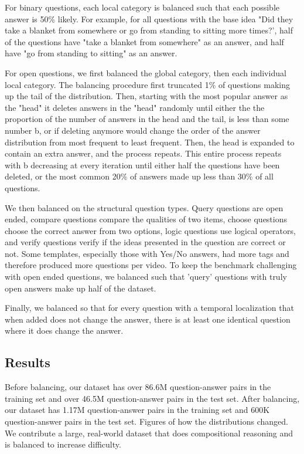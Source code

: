 For binary questions, each local category is balanced such that each possible answer is 50\% likely. For example, for all questions with the base idea "Did they take a blanket from somewhere or go from standing to sitting more times?', half of the questions have "take a blanket from somewhere" as an answer, and half have "go from standing to sitting" as an answer. 

For open questions, we first balanced the global category, then each individual local category. The balancing procedure first truncated 1\% of questions making up the tail of the distribution.  Then, starting with the most popular answer as the "head" it deletes answers in the "head" randomly until either the the proportion of the number of answers in the head and the tail, is less than some number b, or if deleting anymore would change the order of the answer distribution from most frequent to least frequent. Then, the head is expanded to contain an extra answer, and the process repeats. This entire process repeats with b decreasing at every iteration until either half the questions have been deleted, or the most common 20\% of answers made up less than 30\% of all questions.  

We then balanced on the structural question types. Query questions are open ended, compare questions compare the qualities of two items, choose questions choose the correct answer from two options, logic questions use logical operators, and verify questions verify if the ideas presented in the question are correct or not. Some templates, especially those with Yes/No answers, had more tags and therefore produced more questions per video. To keep the benchmark challenging with open ended questions, we balanced such that 'query' questions with truly open answers make up half of the dataset.  

Finally, we balanced so that for every question with a temporal localization that when added does not change the answer, there is at least one identical question where it does change the answer.

\subsection{Results}
Before balancing, our dataset has over 86.6M question-answer pairs in the training set and over 46.5M question-answer pairs in the test set. After balancing, our dataset has 1.17M question-answer pairs in the training set and 600K question-answer pairs in the test set. Figures of how the distributions changed. We contribute a large, real-world dataset that does compositional reasoning and is balanced to increase difficulty. 
